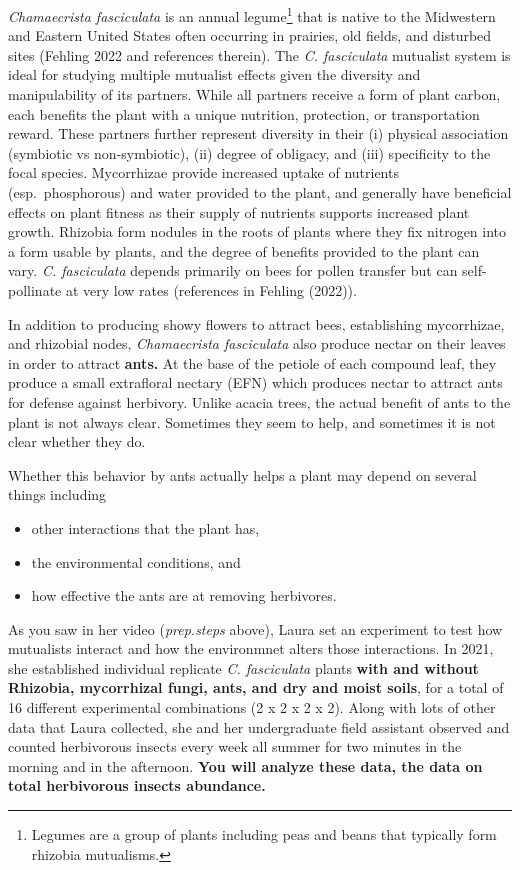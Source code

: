 \documentclass[
  letterpaper,
  DIV=11,
  numbers=noendperiod]{scrreprt}
\providecommand{\tightlist}{%
  \setlength{\itemsep}{0pt}\setlength{\parskip}{0pt}}
\begin{document}
\emph{Chamaecrista fasciculata} is an annual legume\footnote{Legumes are
  a group of plants including peas and beans that typically form
  rhizobia mutualisms.} that is native to the Midwestern and Eastern
United States often occurring in prairies, old fields, and disturbed
sites (Fehling 2022 and references therein). The \emph{C. fasciculata}
mutualist system is ideal for studying multiple mutualist effects given
the diversity and manipulability of its partners. While all partners
receive a form of plant carbon, each benefits the plant with a unique
nutrition, protection, or transportation reward. These partners further
represent diversity in their (i) physical association (symbiotic vs
non-symbiotic), (ii) degree of obligacy, and (iii) specificity to the
focal species. Mycorrhizae provide increased uptake of nutrients
(esp.~phosphorous) and water provided to the plant, and generally have
beneficial effects on plant fitness as their supply of nutrients
supports increased plant growth. Rhizobia form nodules in the roots of
plants where they fix nitrogen into a form usable by plants, and the
degree of benefits provided to the plant can vary. \emph{C. fasciculata}
depends primarily on bees for pollen transfer but can self-pollinate at
very low rates (references in Fehling (2022)).

In addition to producing showy flowers to attract bees, establishing
mycorrhizae, and rhizobial nodes, \emph{Chamaecrista fasciculata} also
produce nectar on their leaves in order to attract \textbf{ants.} At the
base of the petiole of each compound leaf, they produce a small
extrafloral nectary (EFN) which produces nectar to attract ants for
defense against herbivory. Unlike acacia trees, the actual benefit of
ants to the plant is not always clear. Sometimes they seem to help, and
sometimes it is not clear whether they do.

Whether this behavior by ants actually helps a plant may depend on
several things including

\begin{itemize}
\tightlist
\item
  other interactions that the plant has,
\item
  the environmental conditions, and
\item
  how effective the ants are at removing herbivores.
\end{itemize}

As you saw in her video (\emph{prep.steps} above), Laura set an
experiment to test how mutualists interact and how the environmnet
alters those interactions. In 2021, she established individual replicate
\emph{C. fasciculata} plants \textbf{with and without Rhizobia,
mycorrhizal fungi, ants, and dry and moist soils}, for a total of 16
different experimental combinations (2 x 2 x 2 x 2). Along with lots of
other data that Laura collected, she and her undergraduate field
assistant observed and counted herbivorous insects every week all summer
for two minutes in the morning and in the afternoon. \textbf{You will
analyze these data, the data on total herbivorous insects abundance.}
\end{document}

